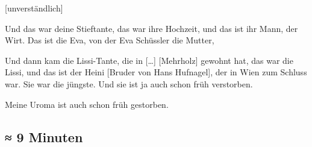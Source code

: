 \documentclass[ngerman,]{article}
\providecommand{\tightlist}{%
  \setlength{\itemsep}{0pt}\setlength{\parskip}{0pt}}
\begin{document}
\begin{multicols}{2}
{[}unverständlich{]}

\begin{description}
\tightlist
\item[Käthe]
Und das war deine Stieftante, das war ihre Hochzeit, und das ist ihr
Mann, der Wirt. Das ist die Eva, von der Eva Schüssler die Mutter,
\item[Käthe]
Und dann kam die Lissi-Tante, die in {[}\ldots{}{]} {[}Mehrholz{]}
gewohnt hat, das war die Lissi, und das ist der Heini {[}Bruder von Hans
Hufnagel{]}, der in Wien zum Schluss war. Sie war die jüngste. Und sie
ist ja auch schon früh verstorben.
\item[Ruth]
Meine Uroma ist auch schon früh gestorben.
\end{description}

\hypertarget{minuten}{%
\subsection{≈ 9 Minuten}\label{minuten}}


\end{multicols}
\end{document}
